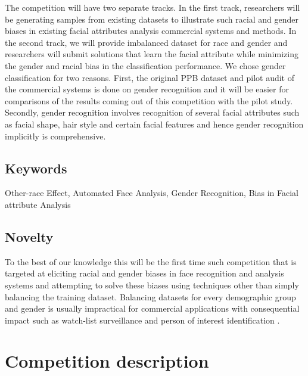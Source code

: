 \documentclass[11pt, oneside]{article}
\makeatletter
\let\@internalcite\cite
\def\cite{\def\citeauthoryear##1##2{##1, ##2}\@internalcite}
\makeatother
\begin{document}
The competition will have two separate tracks. In the first track, researchers will be generating samples from existing datasets to illustrate such racial and gender biases in existing facial attributes analysis commercial systems and methods. In the second track, we will provide imbalanced dataset for race and gender and researchers will submit solutions that learn the facial attribute while minimizing the gender and racial bias in the classification performance. We chose gender classification for two reasons. First, the original PPB dataset and pilot audit of the commercial systems is done on gender recognition and it will be easier for comparisons of the results coming out of this competition with the pilot study. Secondly, gender recognition involves recognition of several facial attributes such as facial shape, hair style and certain facial features and hence gender recognition implicitly is comprehensive.

\subsection{Keywords}
Other-race Effect, Automated Face Analysis, Gender Recognition, Bias in Facial attribute Analysis

\subsection{Novelty}
To the best of our knowledge this will be the first time such competition that is targeted at eliciting racial and gender biases in face recognition and analysis systems and attempting to solve these biases using techniques other than simply balancing the training dataset. Balancing datasets for every demographic group and gender is usually impractical for commercial applications with consequential impact such as watch-list surveillance \cite{kamgar2011toward} and person of interest identification \cite{best2014unconstrained}.

\section{Competition description}
\end{document}

